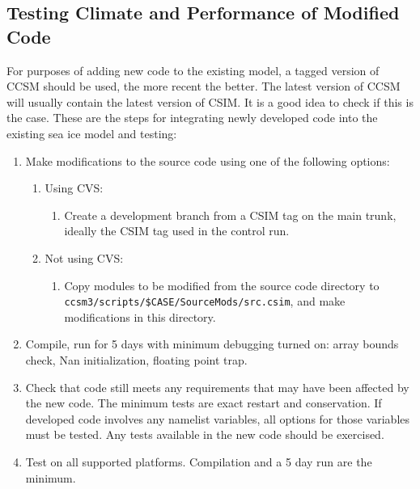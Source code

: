 \subsection{Testing Climate and Performance of Modified Code}
\label{testing_mods}

For purposes of adding new code to the existing model, a tagged version
of CCSM should be used, the more recent the better.  The latest version 
of CCSM will usually contain the latest version of CSIM. It is
a good idea to check if this is the case.  These are the steps for
integrating newly developed code into the existing sea ice model and testing:

\begin{enumerate}

  \item  Make modifications to the source code using one of the following options:
    \begin{enumerate}
      \item  Using CVS:
        \begin{enumerate}
          \item  Create a development branch from a CSIM tag on the main trunk, ideally
                 the CSIM tag used in the control run.
        \end{enumerate}
      \item  Not using CVS:
        \begin{enumerate}
          \item Copy modules to be modified from the source code directory to \\
                {\tt ccsm3/scripts/\$CASE/SourceMods/src.csim}, and make modifications
                in this directory.
        \end{enumerate}
    \end{enumerate}

  \item  Compile, run for 5 days with minimum debugging turned on: array
         bounds check, Nan initialization, floating point trap.

  \item  Check that code still meets any requirements that may have been
         affected by the new code.  The minimum tests are exact restart
         and conservation.  If developed code involves any namelist variables,
         all options for those variables must be tested.  Any tests
         available in the new code should be exercised.

  \item  Test on all supported platforms.  Compilation and a 5 day run are the
         minimum.


\end{enumerate}
